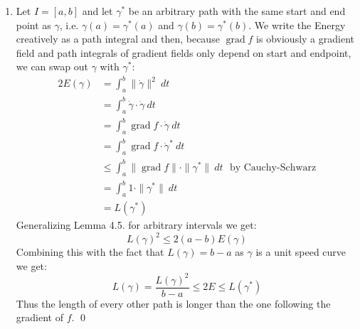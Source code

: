 \documentclass[a4paper,11pt,notitlepage,fullpage]{article}
\DeclareMathOperator{\grad}{grad}
\begin{document}
\begin{enumerate}
\item Let $I = [a,b]$ and let $\gamma^*$ be an arbitrary path with the same start and end point as $\gamma$, i.e. $\gamma(a) = \gamma^*(a)$ and $\gamma(b) = \gamma^*(b)$. We write the Energy creatively as a path integral and then, because $\grad f$ is obviously a gradient field and path integrals of gradient fields only depend on start and endpoint, we can swap out $\gamma$ with $\gamma^*$:
\begin{align*}
2 E(\gamma) &= \int_a^b \|\dot\gamma\|^2 ~dt \\
&= \int_a^b \dot\gamma \cdot \dot\gamma ~dt \\
&= \int_a^b \grad f \cdot \dot\gamma ~dt \\
&= \int_a^b \grad f \cdot \dot\gamma^* ~dt \\
&\leq \int_a^b \|\grad f\| \cdot \|\gamma^*\| ~dt ~~~\text{by Cauchy-Schwarz} \\
&= \int_a^b 1 \cdot \|\gamma^*\| ~dt \\
&= L(\gamma^*)
\end{align*}
Generalizing Lemma 4.5. for arbitrary intervals we get:
\begin{equation*}
L(\gamma)^2 \leq 2(a-b)E(\gamma)
\end{equation*}
Combining this with the fact that $L(\gamma) = b-a$ as $\gamma$ is a unit speed curve we get:
\begin{equation*}
L(\gamma) = \frac{L(\gamma)^2}{b-a} \leq 2E \leq L(\gamma^*)
\end{equation*}
Thus the length of every other path is longer than the one following the gradient of $f$. \qed




\end{enumerate}
\end{document}
